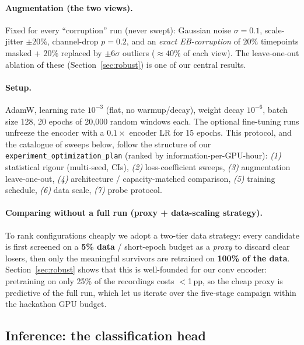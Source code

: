 \documentclass[10pt,a4paper]{article}
\begin{document}
\paragraph{Augmentation (the two views).} Fixed for every ``corruption'' run (never swept): Gaussian noise
$\sigma=0.1$, scale-jitter $\pm20\%$, channel-drop $p=0.2$, and an \emph{exact EB-corruption} of 20\%
timepoints masked + 20\% replaced by $\pm6\sigma$ outliers ($\approx40\%$ of each view). The leave-one-out
ablation of these (Section~\ref{sec:robust}) is one of our central results.

\paragraph{Setup.} AdamW, learning rate $10^{-3}$ (flat, no warmup/decay), weight decay $10^{-6}$, batch
size 128, 20 epochs of 20{,}000 random windows each. The optional fine-tuning runs unfreeze the encoder with
a $0.1\times$ encoder LR for 15 epochs. This protocol, and the catalogue of sweeps below, follow the
structure of our \texttt{experiment\_optimization\_plan} (ranked by information-per-GPU-hour):
\emph{(1)} statistical rigour (multi-seed, CIs), \emph{(2)} loss-coefficient sweeps, \emph{(3)} augmentation
leave-one-out, \emph{(4)} architecture / capacity-matched comparison, \emph{(5)} training schedule,
\emph{(6)} data scale, \emph{(7)} probe protocol.

\paragraph{Comparing without a full run (proxy + data-scaling strategy).} To rank configurations cheaply we
adopt a two-tier data strategy: every candidate is first screened on a \textbf{5\% data} / short-epoch
budget as a \emph{proxy} to discard clear losers, then only the meaningful survivors are retrained on
\textbf{100\% of the data}. Section~\ref{sec:robust} shows that this is well-founded for our conv encoder:
pretraining on only 25\% of the recordings costs $<$1\,pp, so the cheap proxy is predictive of the full
run, which let us iterate over the five-stage campaign within the hackathon GPU budget.

\subsection{Inference: the classification head}
\label{sec:inference}
\end{document}

